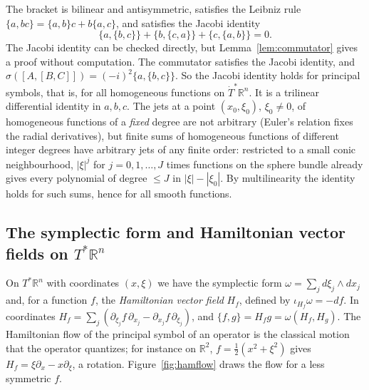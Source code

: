 \documentclass[11pt,oneside,reqno]{article}
\newcommand{\R}{\mathbb R}
\newcommand{\Tdot}{\dot T^*}
\newcommand{\pa}{\partial}
\theoremstyle{plain}
\theoremstyle{definition}
\theoremstyle{remark}
\begin{document}
The bracket is bilinear and antisymmetric, satisfies the Leibniz rule
\(\{a,bc\}=\{a,b\}c+b\{a,c\}\), and satisfies the Jacobi identity
\[
 \{a,\{b,c\}\}+\{b,\{c,a\}\}+\{c,\{a,b\}\}=0 .
\]
The Jacobi identity can be checked directly, but Lemma~\ref{lem:commutator}
gives a proof without computation. The commutator satisfies the Jacobi
identity, and \(\sigma([A,[B,C]])=(-i)^2\{a,\{b,c\}\}\). So the Jacobi identity
holds for principal symbols, that is, for all homogeneous functions on
\(\Tdot\R^n\). It is a trilinear differential identity in \(a,b,c\). The jets at a point
\((x_0,\xi_0)\), \(\xi_0\ne0\), of homogeneous functions of a \emph{fixed} degree are not
arbitrary (Euler's relation fixes the radial derivatives), but finite sums of
homogeneous functions of different integer degrees have arbitrary jets of any
finite order: restricted to a small conic neighbourhood, \(|\xi|^j\) for
\(j=0,1,\dots,J\) times functions on the sphere bundle already gives every
polynomial of degree \(\le J\) in \(|\xi|-|\xi_0|\). By multilinearity the identity holds
for such sums, hence for all smooth functions.

\subsection{The symplectic form and Hamiltonian vector fields on \texorpdfstring{\(T^*\R^n\)}{T*Rn}}
\label{subsec:symplecticRn}
On \(T^*\R^n\) with coordinates \((x,\xi)\) we have the symplectic form
\(\omega=\sum_jd\xi_j\wedge dx_j\) and, for a function \(f\), the
\emph{Hamiltonian vector field} \(H_f\), defined by \(\iota_{H_f}\omega=-df\). In
coordinates \(H_f=\sum_j(\pa_{\xi_j}f\,\pa_{x_j}-\pa_{x_j}f\,\pa_{\xi_j})\), and
\(\{f,g\}=H_fg=\omega(H_f,H_g)\). The Hamiltonian flow of the principal symbol of
an operator is the classical motion that the operator quantizes; for
instance on \(\R^2\), \(f=\frac12(x^2+\xi^2)\) gives \(H_f=\xi\pa_x-x\pa_\xi\), a
rotation.
Figure~\ref{fig:hamflow} draws the flow for a less symmetric \(f\).
\end{document}

